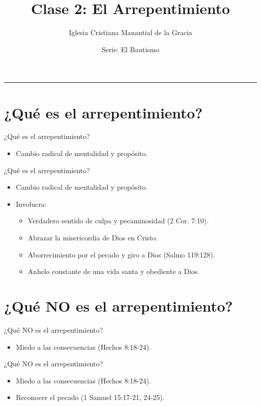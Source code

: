 \documentclass[17pt, aspectratio=169]{beamer}
\title{Clase 2: El Arrepentimiento}
\author{Iglesia Cristiana Manantial de la Gracia}
\date{Serie: El Bautismo}
\begin{document}
\begin{frame}[plain]
    \titlepage
    \centering
    \color{ICMGGold}\rule{0.5\textwidth}{1pt}
\end{frame}

\section{¿Qué es el arrepentimiento?}

\begin{frame}{¿Qué es el arrepentimiento?}
    \begin{itemize}
        \item Cambio radical de mentalidad y propósito.
    \end{itemize}
\end{frame}

\begin{frame}{¿Qué es el arrepentimiento?}
    \begin{itemize}
        \item Cambio radical de mentalidad y propósito.
        \item Involucra:
        \begin{itemize}
            \item Verdadero sentido de culpa y pecaminosidad (2 Cor. 7:10).
            \item Abrazar la misericordia de Dios en Cristo.
            \item Aborrecimiento por el pecado y giro a Dios (Salmo 119:128).
            \item Anhelo constante de una vida santa y obediente a Dios.
        \end{itemize}
    \end{itemize}
\end{frame}

\section{¿Qué NO es el arrepentimiento?}

\begin{frame}{¿Qué NO es el arrepentimiento?}
    \begin{itemize}
        \item Miedo a las consecuencias (Hechos 8:18-24).
    \end{itemize}
\end{frame}

\begin{frame}{¿Qué NO es el arrepentimiento?}
    \begin{itemize}
        \item Miedo a las consecuencias (Hechos 8:18-24).
        \item Reconocer el pecado (1 Samuel 15:17-21, 24-25).
    \end{itemize}
\end{frame}
\end{document}
